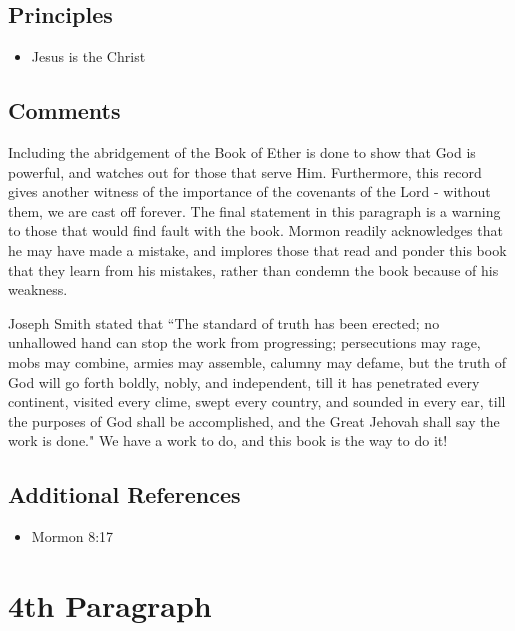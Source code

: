 \documentclass[12pt]{report}
\begin{document}
\section{Principles\label{titlePage:principles3}}
\begin{itemize}
\item {}Jesus is the Christ
\end{itemize}

\section{Comments\label{titlePage_comments3}}
Including the abridgement of the Book of Ether is done to show that God is powerful, and watches out for those that serve Him.  Furthermore, this record gives another witness of the importance of the covenants of the Lord - without them, we are cast off forever.  The final statement in this paragraph is a warning to those that would find fault with the book.  Mormon readily acknowledges that he may have made a mistake, and implores those that read and ponder this book that they learn from his mistakes, rather than condemn the book because of his weakness.

Joseph Smith stated that ``The standard of truth has been erected; no unhallowed hand can stop the work from progressing; persecutions may rage, mobs may combine, armies may assemble, calumny may defame, but the truth of God will go forth boldly, nobly, and independent, till it has penetrated every continent, visited every clime, swept every country, and sounded in every ear, till the purposes of God shall be accomplished, and the Great Jehovah shall say the work is done."  We have a work to do, and this book is the way to do it!

\section{Additional References\label{titlePage:references3}}
\begin{itemize}
\item Mormon 8:17
\end{itemize}

\chapter{4th Paragraph\label{titlePage:4th}}
\begin{center}
\end{center}
\end{document}
